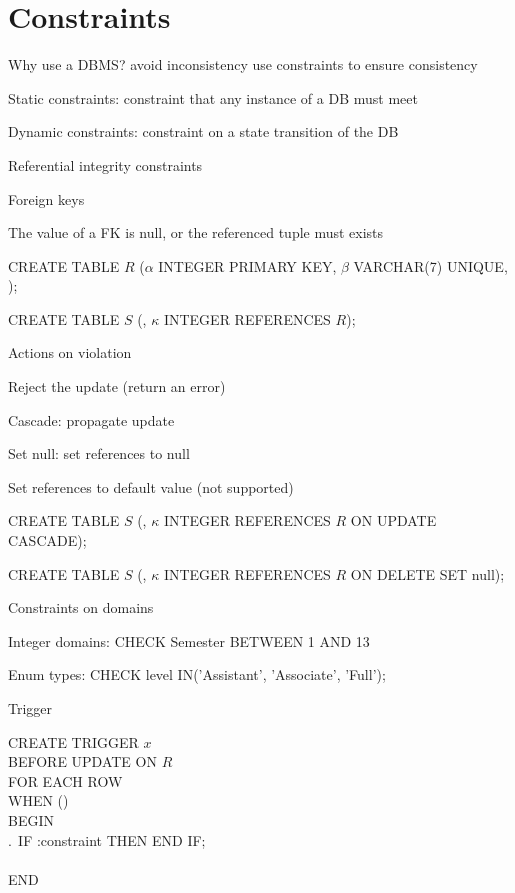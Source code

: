 \section{Constraints}
\enumstart
	\item Why use a DBMS? avoid inconsistency \arrow use constraints to ensure consistency
	\item Static constraints: constraint that any instance of a DB must meet
	\item Dynamic constraints: constraint on a state transition of the DB
	\item Referential integrity constraints
	\enumstart
		\item Foreign keys
		\item The value of a FK is null, or the referenced tuple must exists
		\item CREATE TABLE $R$ ($\alpha$ INTEGER PRIMARY KEY, $\beta$ VARCHAR(7) UNIQUE, \ddd);
		\item CREATE TABLE $S$ (\ddd, $\kappa$ INTEGER REFERENCES $R$);
		\item Actions on violation
		\enumstart
			\item Reject the update (return an error)
			\item Cascade: propagate update
			\item Set null: set references to null
			\item Set references to default value (not supported)
		\enumend
		\item CREATE TABLE $S$ (\ddd, $\kappa$ INTEGER REFERENCES $R$ ON UPDATE CASCADE);
		\item CREATE TABLE $S$ (\ddd, $\kappa$ INTEGER REFERENCES $R$ ON DELETE SET null);
	\enumend
	\item Constraints on domains
	\enumstart
		\item Integer domains: CHECK Semester BETWEEN 1 AND 13
		\item Enum types: CHECK level IN('Assistant', 'Associate', 'Full');
	\enumend
	\item Trigger
	\enumstart
		\item CREATE TRIGGER $x$\\BEFORE UPDATE ON $R$\\FOR EACH ROW\\WHEN (\ddd)\\BEGIN\\$. \ \ $IF :constraint THEN \ddd END IF;\\\ddd\\END
	\enumend
\enumend
